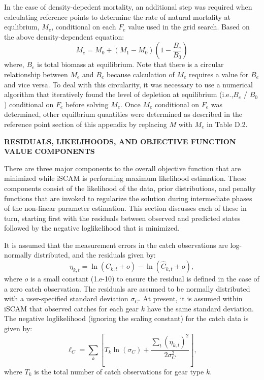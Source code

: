 \documentclass[11pt]{article}   %
\def\AppLet{D}                   %
\def\headc{\vspace{-1ex}} %
\def\subsub#1{\noindent {\bf #1} \headc}    %
\def\vsd{\vspace*{1ex}}     %
\begin{document}
In the case of density-depedent mortality, an additional step was required when calculating reference points to determine the rate of natural mortality at equlibrium, $M_e$, conditional on each $F_e$ value used in the grid search.  Based on the above density-dependent equation:
\[
M_e = M_0 + (M_1 - M_0)(1 - \frac{B_e}{B_0})
\]
where, $B_e$ is total biomass at equilibrium. Note that there is a circular relationship between $M_e$ and $B_e$ because calculation of $M_e$ requires a value for $B_e$ and vice versa.  To deal with this circularity, it was necessary to use a numerical algorithm that iteratively found the level of depletion at equilibrium (i.e.,$B_e$ / $B_0$) conditional on $F_e$ before solving $M_e$.  Once $M_e$ conditional on $F_e$ was determined, other equilbrium quantities were determined as described in the reference point section of this appendix by replacing $M$ with $M_e$ in Table \AppLet.2.



\vsd
\vsd


{ \bf RESIDUALS, LIKELIHOODS, AND OBJECTIVE FUNCTION VALUE COMPONENTS}

There are three major components to the overall objective function that are minimized while iSCAM is performing maximum likelihood estimation.  These components consist of the likelihood of the data, prior distributions, and penalty functions that are invoked to regularize the solution during intermediate phases of the non-linear parameter estimation.  This section discusses each of these in turn, starting first with the residuals between observed and predicted states followed by the negative loglikelihood that is minimized.

\subsub{Catch Data}

It is assumed that the measurement errors in the catch observations are log-normally distributed, and the residuals given by:
\begin{equation}\label{df27}
\eta_{k,t}=\ln(C_{k,t}+o) -  \ln(\hat{C}_{k,t}+o),
\end{equation}
where $o$ is  a small constant (1.e-10) to ensure the residual is defined in the case of a zero catch observation.  The residuals are assumed to be normally distributed with a user-specified standard deviation $\sigma_{C}$.  At present, it is assumed within iSCAM that observed catches for each gear $k$  have the same standard deviation.  The negative loglikelihood (ignoring the scaling constant) for the catch data is given by:
\begin{equation}\label{df28}
\ell_C = \sum_k\left[  T_k\ln(\sigma_C)+\frac{\sum_t(\eta_{k,t})^2}{2\sigma_C^2}\right],
\end{equation}
where $T_k$ is the total number of catch observations for gear type $k$.
\end{document}
